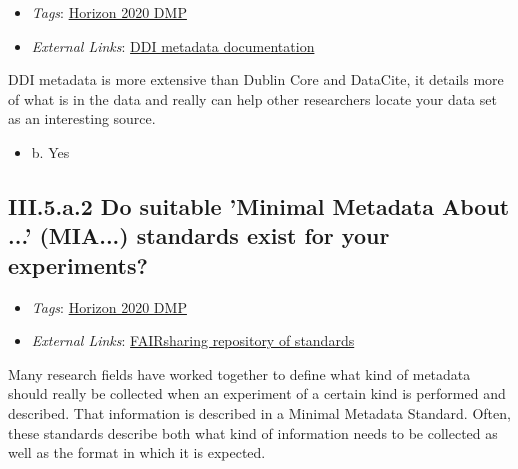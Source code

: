 \documentclass[a4paper,12pt]{report}
\begin{document}
\begin{itemize}
  \item \textit{Tags}: \ul{Horizon 2020 DMP}
  
  \item \textit{External Links}: \href{https://ddialliance.org/explore-documentation}{DDI metadata documentation}\end{itemize}


\noindent
\begin{markdown}
DDI metadata is more extensive than Dublin Core and DataCite, it details more of what is in the data and really can help other researchers locate your data set as an interesting source.
\end{markdown}



\begin{itemize}
  \item[\CheckmarkBold] b. Yes
\end{itemize}




\subsection*{\protect\textcolor{colorSecId}{III.5.a.2} Do suitable 'Minimal Metadata About ...' (MIA...) standards exist for your experiments?}

\label{b1df3c74-0b1f-4574-81c4-4cc2d780c1af.8c962e6f-17ee-4b22-8ebb-9f06f779e3b3.6d18bfff-0f53-469b-934e-9806dda9d4fb.6226d7f2-565f-4991-94b3-c00be6aca20e}


\begin{itemize}
  \item \textit{Tags}: \ul{Horizon 2020 DMP}
  
  \item \textit{External Links}: \href{http://fairsharing.org/}{FAIRsharing repository of standards}\end{itemize}


\noindent
\begin{markdown}
Many research fields have worked together to define what kind of metadata should really be collected when an experiment of a certain kind is performed and described. That information is described in a Minimal Metadata Standard. Often, these standards describe both what kind of information needs to be collected as well as the format in which it is expected.
\end{markdown}
\end{document}
